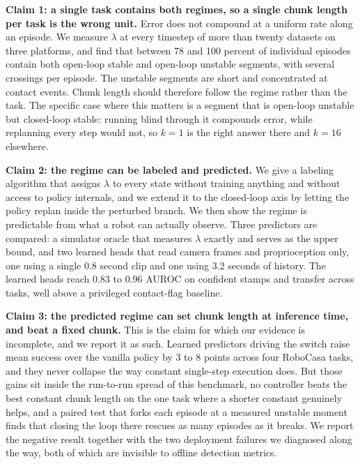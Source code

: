 

\textbf{Claim 1: a single task contains both regimes, so a single chunk length
per task is the wrong unit.} Error does not compound at a uniform rate along
an episode. We measure $\lambda$ at every timestep of more than twenty datasets
on three platforms, and find that between 78 and 100 percent of individual
episodes contain both open-loop stable and open-loop unstable segments, with
several crossings per episode. The unstable segments are short and concentrated
at contact events. Chunk length should therefore follow the regime rather than
the task. The specific case where this matters is a segment that is open-loop
unstable but closed-loop stable: running blind through it compounds error,
while replanning every step would not, so $k{=}1$ is the right answer there and
$k{=}16$ elsewhere.

\textbf{Claim 2: the regime can be labeled and predicted.} We give a labeling
algorithm that assigns $\lambda$ to every state without training anything and
without access to policy internals, and we extend it to the closed-loop axis by
letting the policy replan inside the perturbed branch. We then show the regime
is predictable from what a robot can actually observe. Three predictors are
compared: a simulator oracle that measures $\lambda$ exactly and serves as the
upper bound, and two learned heads that read camera frames and proprioception
only, one using a single 0.8 second clip and one using 3.2 seconds of history.
The learned heads reach 0.83 to 0.96 AUROC on confident stamps and transfer
across tasks, well above a privileged contact-flag baseline.

\textbf{Claim 3: the predicted regime can set chunk length at inference time,
and beat a fixed chunk.} This is the claim for which our evidence is
incomplete, and we report it as such. Learned predictors driving the switch
raise mean success over the vanilla policy by 3 to 8 points across four
RoboCasa tasks, and they never collapse the way constant single-step execution
does. But those gains sit inside the run-to-run spread of this benchmark, no
controller beats the best constant chunk length on the one task where a shorter
constant genuinely helps, and a paired test that forks each episode at a
measured unstable moment finds that closing the loop there rescues as many
episodes as it breaks. We report the negative result together with the two
deployment failures we diagnosed along the way, both of which are invisible to
offline detection metrics.

